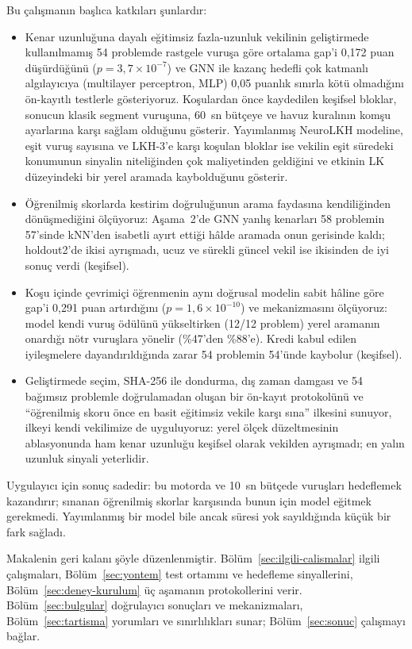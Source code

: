 \documentclass[pdflatex,sn-basic]{sn-jnl}
\begin{document}
Bu çalışmanın başlıca katkıları şunlardır:
\begin{itemize}
  \item Kenar uzunluğuna dayalı eğitimsiz fazla-uzunluk vekilinin geliştirmede kullanılmamış 54 problemde rastgele vuruşa göre ortalama
  gap'i 0,172 puan düşürdüğünü ($p=3{,}7\times10^{-7}$) ve GNN ile kazanç hedefli çok katmanlı
  algılayıcıya (multilayer perceptron, MLP) 0,05 puanlık sınırla kötü olmadığını ön-kayıtlı
  testlerle gösteriyoruz. Koşulardan önce kaydedilen keşifsel bloklar, sonucun klasik segment
  vuruşuna, 60~sn bütçeye ve havuz kuralının komşu ayarlarına karşı sağlam olduğunu gösterir.
  Yayımlanmış NeuroLKH modeline, eşit vuruş sayısına ve LKH-3'e karşı koşulan bloklar ise vekilin
  eşit süredeki konumunun sinyalin niteliğinden çok maliyetinden geldiğini ve etkinin LK düzeyindeki
  bir yerel aramada kaybolduğunu gösterir.
  \item Öğrenilmiş skorlarda kestirim doğruluğunun arama faydasına kendiliğinden dönüşmediğini
  ölçüyoruz: Aşama~2'de GNN yanlış kenarları 58 problemin 57'sinde kNN'den isabetli ayırt ettiği
  hâlde aramada onun gerisinde kaldı; holdout2'de ikisi ayrışmadı, ucuz ve sürekli güncel vekil ise
  ikisinden de iyi sonuç verdi (keşifsel).
  \item Koşu içinde çevrimiçi öğrenmenin aynı doğrusal modelin sabit hâline göre gap'i 0,291 puan
  artırdığını ($p=1{,}6\times10^{-10}$) ve mekanizmasını ölçüyoruz: model kendi vuruş ödülünü
  yükseltirken (12/12 problem) yerel aramanın onardığı nötr vuruşlara yönelir (\%47'den \%88'e).
  Kredi kabul edilen iyileşmelere dayandırıldığında zarar 54 problemin 54'ünde kaybolur (keşifsel).
  \item Geliştirmede seçim, SHA-256 ile dondurma, dış zaman damgası ve 54 bağımsız problemle
  doğrulamadan oluşan bir ön-kayıt protokolünü ve ``öğrenilmiş skoru önce en basit eğitimsiz vekile
  karşı sına'' ilkesini sunuyor, ilkeyi kendi vekilimize de uyguluyoruz: yerel ölçek düzeltmesinin
  ablasyonunda ham kenar uzunluğu keşifsel olarak vekilden ayrışmadı; en yalın uzunluk sinyali
  yeterlidir.
\end{itemize}

Uygulayıcı için sonuç sadedir: bu motorda ve 10~sn bütçede vuruşları hedeflemek kazandırır;
sınanan öğrenilmiş skorlar karşısında bunun için model eğitmek gerekmedi. Yayımlanmış bir model
bile ancak süresi yok sayıldığında küçük bir fark sağladı.

Makalenin geri kalanı şöyle düzenlenmiştir.
Bölüm~\ref{sec:ilgili-calismalar} ilgili çalışmaları, Bölüm~\ref{sec:yontem} test ortamını ve
hedefleme sinyallerini, Bölüm~\ref{sec:deney-kurulum} üç aşamanın protokollerini verir.
Bölüm~\ref{sec:bulgular} doğrulayıcı sonuçları ve mekanizmaları, Bölüm~\ref{sec:tartisma}
yorumları ve sınırlılıkları sunar; Bölüm~\ref{sec:sonuc} çalışmayı bağlar.
\end{document}
